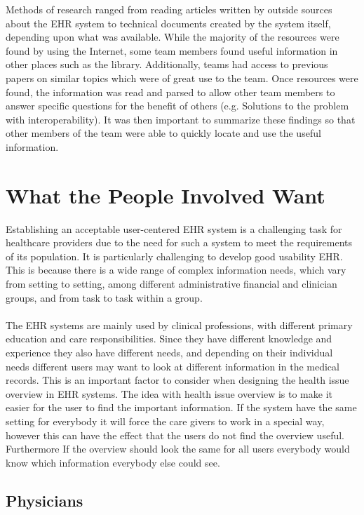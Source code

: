 \documentclass[14pt]{article}
\begin{document}
Methods of research ranged from reading articles written by outside sources about the \gls{EHR} system to technical documents created by the system itself, depending upon what was available.  While the majority of the resources were found by using the Internet, some team members found useful information in other places such as the library.  Additionally, teams had access to previous papers on similar topics which were of great use to the team.  Once resources were found, the information was read and parsed to allow other team members to answer specific questions for the benefit of others (e.g. Solutions to the problem with interoperability).  It was then important to summarize these findings so that other members of the team were able to quickly locate and use the useful information.


\newpage

\section{What the People Involved Want}
\label{sec:People}
Establishing an acceptable user-centered  \gls{EHR} system is a challenging task for healthcare providers due to the need for such a system to meet the requirements of its population. It is particularly challenging to develop good usability  \gls{EHR}. This is because there is a wide range of complex information needs, which vary from setting to setting, among different administrative financial and clinician groups, and from task to task within a group.
\\\\
The \gls{EHR} systems are mainly used by clinical professions, with different primary education and care responsibilities. Since they have different knowledge and experience they also have different needs, and depending on their individual needs different users may want to look at different information in the medical records. This is an important factor to consider when designing the health issue overview in \gls{EHR} systems. The idea with health issue overview is to make it easier for the user to find the important information. If the system have the same setting for everybody it will force the care givers to work in a special way, however this can have the effect that the users do not find the overview useful. Furthermore If the overview should look the same for all users everybody would know which information everybody else could see.

\subsection{Physicians}
\end{document}
